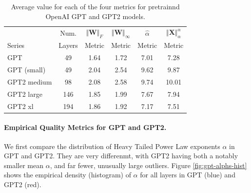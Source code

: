 \begin{table}[t]
\small
\begin{center}
\begin{tabular}{|p{0.75in}|c|c|c|c|c|}
\hline
        & Num.   & $\Vert\mathbf{W}\Vert_{F}$ & $\Vert\mathbf{W}\Vert_{\infty}$ & $\hat{\alpha}$ & $\Vert\mathbf{X}\Vert^{\alpha}_{\alpha}$ \\
 Series & Layers & Metric                     & Metric                          & Metric         & Metric                                   \\
\hline
GPT & 49 & 1.64  & 1.72 & 7.01 & 7.28 \\
GPT (small) & 49 & 2.04  & 2.54& 9.62 & 9.87 \\
GPT2 medium & 98 & 2.08 & 2.58& 9.74 & 10.01 \\
GPT2 large & 146 & 1.85 & 1.99& 7.67 & 7.94 \\
GPT2 xl & 194 & 1.86 & 1.92 & 7.17 & 7.51 \\
\hline
\end{tabular}
\end{center}
\caption{Average value for each of the four metrics for pretrainnd OpenAI GPT and GPT2 models.}
\label{table:nlp}
\end{table}


\paragraph{Empirical Quality Metrics for GPT and GPT2.}

We first compare the distribution of  Heavy Tailed Power Law exponents $\alpha$ in GPT and GPT2.
They are very differenmt, with GPT2 having both a notably smaller mean $\alpha$, and far fewer, unusually large outliers.
Figure \ref{fig:gpt-alphs-hist} shows the empirical density (histogram) of $\alpha$
for all layers in GPT (blue) and GPT2 (red).  

